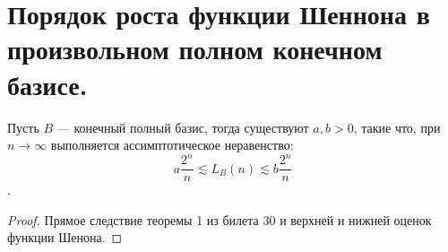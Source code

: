 \section{Порядок роста функции Шеннона в произвольном полном конечном базисе.}

\begin{theorem}
    Пусть $B$ --- конечный полный базис, тогда существуют $a, b > 0$, такие что, при $n\to \infty$ выполняется ассимптотическое неравенство:
    \[
        a\frac{2^n}{n} \lesssim L_B(n) \lesssim b\frac{2^n}{n}
    \].
\end{theorem}

\begin{proof}
    Прямое следствие теоремы 1 из билета 30 и верхней и нижней оценок функции Шенона.
\end{proof}